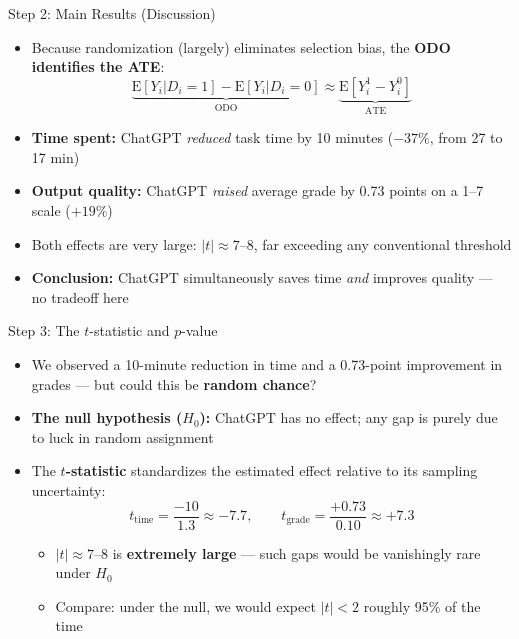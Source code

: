 \documentclass[hyperref={pdfpagelabels=false}]{beamer}
\begin{document}
	\begin{frame}{Step 2: Main Results (Discussion)}
		\begin{itemize}
			\item Because randomization (largely) eliminates selection bias, the \textbf{ODO identifies the ATE}:
			\begin{equation*}
				\underbrace{\mathrm{E}[Y_i | D_i=1] - \mathrm{E}[Y_i | D_i=0]}_{\text{ODO}} \approx \underbrace{\mathrm{E}[Y^1_i - Y^0_i]}_{\text{ATE}}
			\end{equation*}
			\vspace{0.2cm}
			\item \textbf{Time spent:} ChatGPT \emph{reduced} task time by 10 minutes ($-37\%$, from 27 to 17 min)
			\vspace{0.2cm}
			\item \textbf{Output quality:} ChatGPT \emph{raised} average grade by 0.73 points on a 1--7 scale ($+19\%$)
			\vspace{0.2cm}
			\item Both effects are very large: $|t| \approx 7$--$8$, far exceeding any conventional threshold
			\vspace{0.2cm}
			\item \textbf{Conclusion:} ChatGPT simultaneously saves time \emph{and} improves quality --- no tradeoff here
		\end{itemize}
	\end{frame}
	
	\begin{frame}{Step 3: The $t$-statistic and $p$-value}
		\begin{itemize}
			\item We observed a 10-minute reduction in time and a 0.73-point improvement in grades --- but could this be \textbf{random chance}?
			\vspace{0.3cm}
			\item \textbf{The null hypothesis ($H_0$):} ChatGPT has no effect; any gap is purely due to luck in random assignment
			\vspace{0.3cm}
			\item The \textbf{$t$-statistic} standardizes the estimated effect relative to its sampling uncertainty:
			\begin{equation*}
				t_{\text{time}} = \frac{-10}{1.3} \approx -7.7, \qquad t_{\text{grade}} = \frac{+0.73}{0.10} \approx +7.3
			\end{equation*}
			\vspace{0.2cm}
			\begin{itemize}
				\item $|t| \approx 7$--$8$ is \textbf{extremely large} --- such gaps would be vanishingly rare under $H_0$
				\vspace{0.2cm}
				\item Compare: under the null, we would expect $|t| < 2$ roughly 95\% of the time
			\end{itemize}
		\end{itemize}
	\end{frame}
	
\end{document}
